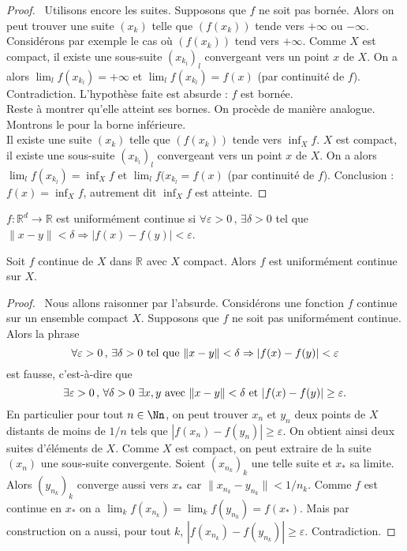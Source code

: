 \documentclass[class=report,crop=false]{standalone}
\begin{document}
\begin{proof} \rm \ 
Utilisons encore les suites. Supposons que $f$ ne soit pas bornée. Alors on peut trouver une suite $(x_k)$ telle que $(f(x_k))$ tende vers $+\infty$ ou $-\infty$. Considérons par exemple le cas o\`u $ (f(x_k))$ tend vers $+\infty$. Comme $X$ est compact, il existe une sous-suite $(x_{k_l})_l$ convergeant vers un point $x$ de $X$. On a alors $\lim_l f(x_{k_l})=+\infty$ et  $\lim_l f(x_{k_l})=f(x)$ (par continuité de $f$). Contradiction. L'hypoth\`ese faite est absurde : $f$ est bornée. \\
Reste \`a montrer qu'elle atteint ses bornes. On proc\`ede de mani\`ere analogue. Montrons le pour la borne inférieure.\\
Il existe une suite $(x_k)$ telle que $(f(x_k))$ tende vers $\inf_X f$. $X$ est compact, il existe une sous-suite $(x_{k_l})_l$ convergeant vers un point $x$ de $X$. On a alors $\lim_l f(x_{k_l})=\inf_X f$ et  $\lim_l f(x_{k_l}=f(x)$ (par continuité de $f$). Conclusion : $f(x)=\inf_X f$, autrement dit $\inf_X f$ est atteinte. \end{proof}

\begin{definition}
$f : \mathbb{R}^d \rightarrow \mathbb{R}$ est uniformément continue si $\forall \varepsilon > 0\,,\,\exists \delta > 0$ tel que $\|x - y\| < \delta \Rightarrow |f(x) - f(y)| < \varepsilon$.
\end{definition}

\begin{theoreme}
Soit $f$ continue de $X$ dans $\mathbb{R}$ avec $X$ compact. Alors $f$ est uniformément continue sur $X$.
\end{theoreme}
\begin{proof} \ \rm Nous allons raisonner par l'absurde. Considérons une fonction $f$ continue sur un ensemble compact $X$. Supposons que $f$ ne soit pas uniformément continue. Alors la phrase
$$
\forall \varepsilon > 0\,,\,\exists \delta > 0\ {\rm  tel\  que}\ \|x - y\| < \delta \Rightarrow |f(x) - f(y)| < \varepsilon
$$
est fausse, c'est-\`a-dire que
$$
\exists \varepsilon > 0\,,\,\forall \delta > 0\ \exists x,y\  {\rm avec}\ \|x - y\| < \delta \  {\rm et}\  |f(x) - f(y)| \geq \varepsilon.
$$
En particulier pour tout $n\in \Nn$, on peut trouver $x_n$ et $y_n$ deux points de $X$ distants de moins de $1/n$ tels que  $|f(x_n) - f(y_n)| \geq \varepsilon$. On obtient ainsi deux suites d'éléments de $X$. Comme $X$ est compact, on peut extraire de la suite $(x_n)$ une sous-suite convergente. Soient $(x_{n_k})_k$ une telle suite et $x_*$ sa limite. Alors $(y_{n_k})_k$ converge aussi vers $x_*$ car $\|x_{n_k} - y_{n_k}\|<1/{n_k}$. Comme $f$ est continue en $x_*$ on a
$\lim_kf(x_{n_k})=\lim_k f(y_{n_k})=f(x_*)$. Mais par construction on a aussi, pour tout $k$, $|f(x_{n_k}) - f(y_{n_k})| \geq \varepsilon$. Contradiction.
\end{proof}
\end{document}
